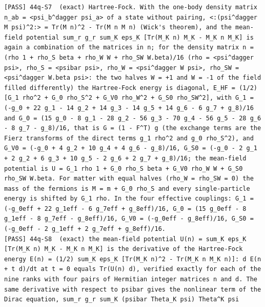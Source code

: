 \documentclass[
  10pt,
]{article}
\begin{document}
\begin{verbatim}
[PASS] 44q-S7  (exact) Hartree-Fock. With the one-body density matrix n_ab = <psi_b^dagger psi_a> of a state without pairing, <:(psi^dagger M psi)^2:> = Tr(M n)^2 - Tr(M n M n) (Wick's theorem), and the mean-field potential sum_r g_r sum_K eps_K [Tr(M_K n) M_K - M_K n M_K] is again a combination of the matrices in n; for the density matrix n = (rho 1 + rho_S beta + rho_W W + rho_SW W.beta)/16 (rho = <psi^dagger psi>, rho_S = <psibar psi>, rho_W = <psi^dagger W psi>, rho_SW = <psi^dagger W.beta psi>: the two halves W = +1 and W = -1 of the field filled differently) the Hartree-Fock energy is diagonal, E_HF = (1/2)[G_1 rho^2 + G_0 rho_S^2 + G_V0 rho_W^2 + G_S0 rho_SW^2], with G_1 = (-g_0 + 22 g_1 - 14 g_2 + 14 g_3 - 14 g_5 + 14 g_6 - 6 g_7 + g_8)/16 and G_0 = (15 g_0 - 8 g_1 - 28 g_2 - 56 g_3 - 70 g_4 - 56 g_5 - 28 g_6 - 8 g_7 - g_8)/16, that is G = (1 - F^T) g (the exchange terms are the Fierz transforms of the direct terms g_1 rho^2 and g_0 rho_S^2), and G_V0 = (-g_0 + 4 g_2 + 10 g_4 + 4 g_6 - g_8)/16, G_S0 = (-g_0 - 2 g_1 + 2 g_2 + 6 g_3 + 10 g_5 - 2 g_6 + 2 g_7 + g_8)/16; the mean-field potential is U = G_1 rho 1 + G_0 rho_S beta + G_V0 rho_W W + G_S0 rho_SW W.beta. For matter with equal halves (rho_W = rho_SW = 0) the mass of the fermions is M = m + G_0 rho_S and every single-particle energy is shifted by G_1 rho. In the four effective couplings: G_1 = (-g_0eff + 22 g_1eff - 6 g_7eff + g_8eff)/16, G_0 = (15 g_0eff - 8 g_1eff - 8 g_7eff - g_8eff)/16, G_V0 = (-g_0eff - g_8eff)/16, G_S0 = (-g_0eff - 2 g_1eff + 2 g_7eff + g_8eff)/16.
[PASS] 44q-S8  (exact) the mean-field potential U(n) = sum_K eps_K [Tr(M_K n) M_K - M_K n M_K] is the derivative of the Hartree-Fock energy E(n) = (1/2) sum_K eps_K [Tr(M_K n)^2 - Tr(M_K n M_K n)]: d E(n + t d)/dt at t = 0 equals Tr(U(n) d), verified exactly for each of the nine ranks with four pairs of Hermitian integer matrices n and d. The same derivative with respect to psibar gives the nonlinear term of the Dirac equation, sum_r g_r sum_K (psibar Theta_K psi) Theta^K psi

\end{verbatim}
\end{document}
